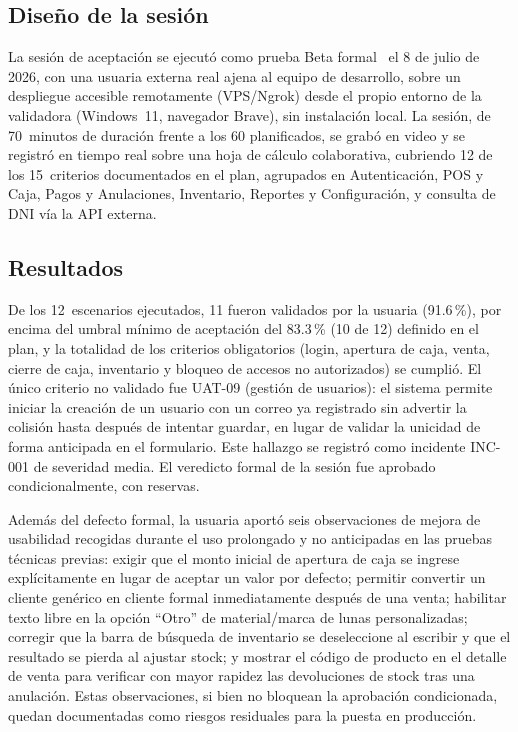 \documentclass[conference]{IEEEtran}
\begin{document}
\subsection{Diseño de la sesión}

La sesión de aceptación se ejecutó como prueba Beta formal~\cite{pressman2010} el 8 de julio de 2026, con una usuaria externa real ajena al equipo de desarrollo, sobre un despliegue accesible remotamente (VPS/Ngrok) desde el propio entorno de la validadora (Windows~11, navegador Brave), sin instalación local. La sesión, de 70~minutos de duración frente a los 60 planificados, se grabó en video y se registró en tiempo real sobre una hoja de cálculo colaborativa, cubriendo 12 de los 15~criterios documentados en el plan, agrupados en Autenticación, POS y Caja, Pagos y Anulaciones, Inventario, Reportes y Configuración, y consulta de DNI vía la API externa.

\subsection{Resultados}

De los 12~escenarios ejecutados, 11 fueron validados por la usuaria (91.6\,\%), por encima del umbral mínimo de aceptación del 83.3\,\% (10 de 12) definido en el plan, y la totalidad de los criterios obligatorios (login, apertura de caja, venta, cierre de caja, inventario y bloqueo de accesos no autorizados) se cumplió. El único criterio no validado fue UAT-09 (gestión de usuarios): el sistema permite iniciar la creación de un usuario con un correo ya registrado sin advertir la colisión hasta después de intentar guardar, en lugar de validar la unicidad de forma anticipada en el formulario. Este hallazgo se registró como incidente INC-001 de severidad media. El veredicto formal de la sesión fue aprobado condicionalmente, con reservas.

Además del defecto formal, la usuaria aportó seis observaciones de mejora de usabilidad recogidas durante el uso prolongado y no anticipadas en las pruebas técnicas previas: exigir que el monto inicial de apertura de caja se ingrese explícitamente en lugar de aceptar un valor por defecto; permitir convertir un cliente genérico en cliente formal inmediatamente después de una venta; habilitar texto libre en la opción ``Otro'' de material/marca de lunas personalizadas; corregir que la barra de búsqueda de inventario se deseleccione al escribir y que el resultado se pierda al ajustar stock; y mostrar el código de producto en el detalle de venta para verificar con mayor rapidez las devoluciones de stock tras una anulación. Estas observaciones, si bien no bloquean la aprobación condicionada, quedan documentadas como riesgos residuales para la puesta en producción.
\end{document}
